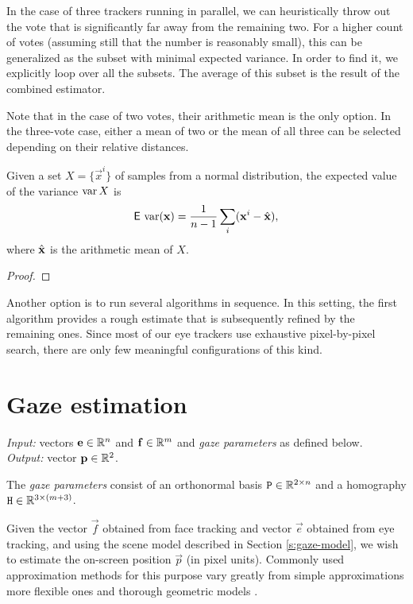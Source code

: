 In the case of three trackers running in parallel, we can heuristically throw out the vote that is significantly far away from the remaining two.
For a higher count of votes (assuming still that the number is reasonably small), this can be generalized as the subset with minimal expected variance.
In order to find it, we explicitly loop over all the subsets.
The average of this subset is the result of the combined estimator.

Note that in the case of two votes, their arithmetic mean is the only option.
In the three-vote case, either a mean of two or the mean of all three can be selected depending on their relative distances.

\begin{lemma}
Given a set $X = \{\vec x^i\}$ of samples from a normal distribution, the expected value of the variance $\operatorname{\mathrm{var}} X$ is
$$\operatorname{\textsf{E}\,}\operatorname{\mathrm{var}} (\mathbf{x}) = \frac 1 {n - 1} \sum_i (\mathbf{x}^i - \hat{\mathbf{x}}),$$
where $\hat{\mathbf{x}}$ is the arithmetic mean of $X$.
\end{lemma}
\begin{proof}
\end{proof}

Another option is to run several algorithms in sequence.
In this setting, the first algorithm provides a rough estimate that is subsequently refined by the remaining ones.
Since most of our eye trackers use exhaustive pixel-by-pixel search, there are only few meaningful configurations of this kind.

\section{Gaze estimation}
\label{s:impl-gaze}

\textit{Input:} vectors $\mathbf{e} \in \mathbb{R}^n$ and $\mathbf{f} \in \mathbb{R}^m$ and \textit{gaze parameters} as defined below.\\
\textit{Output:} vector $\mathbf{p} \in \mathbb{R}^2$.\\

\begin{definition} \label{d:gaze-parameters}
The \textit{gaze parameters} consist of an orthonormal basis $\mathtt{P} \in \mathbb{R}^{2\times n}$ and a homography $\mathtt{H} \in \mathbb{R}^{3 \times (m+3)}$.
\end{definition}

Given the vector $\vec f$ obtained from face tracking and vector $\vec e$ obtained from eye tracking, and using the scene model described in Section \ref{s:gaze-model}, we wish to estimate the on-screen position $\vec p$ (in pixel units).
Commonly used approximation methods for this purpose vary greatly from simple approximations \cite{zhu12} more flexible ones \cite{kassner14,yucel09} and thorough geometric models \cite{villanueva08,wang16}.

